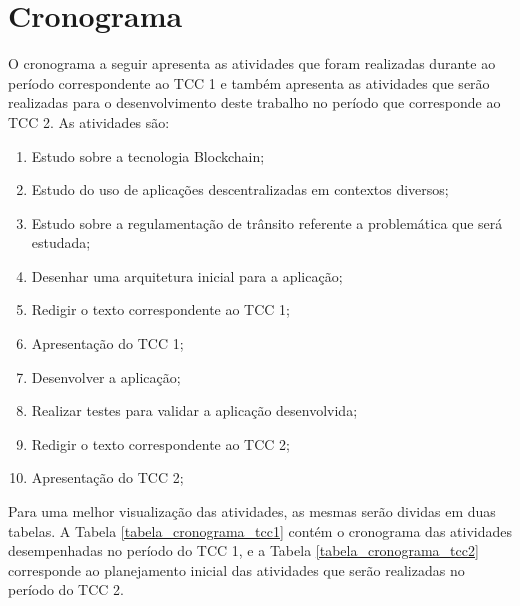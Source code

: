 \section{Cronograma}

O cronograma a seguir apresenta as atividades que foram realizadas durante ao período correspondente ao TCC 1 e também apresenta as atividades que serão realizadas para o desenvolvimento deste
trabalho no período que corresponde ao TCC 2. As atividades são:

    \begin{enumerate}
        \item Estudo sobre a tecnologia Blockchain;
        \item Estudo do uso de aplicações descentralizadas em contextos diversos;
        \item Estudo sobre a regulamentação de trânsito referente a problemática que será estudada;
        \item Desenhar uma arquitetura inicial para a aplicação;
        \item Redigir o texto correspondente ao TCC 1;
        \item Apresentação do TCC 1;
        \item Desenvolver a aplicação;
        \item Realizar testes para validar a aplicação desenvolvida;
        \item Redigir o texto correspondente ao TCC 2;
        \item Apresentação do TCC 2;
    \end{enumerate}
    
    
Para uma melhor visualização das atividades, as mesmas serão dividas em duas tabelas. A Tabela \ref{tabela_cronograma_tcc1} contém o cronograma das atividades desempenhadas no período do TCC 1, e a Tabela \ref{tabela_cronograma_tcc2} corresponde ao planejamento inicial das atividades que serão realizadas no período do TCC 2.


